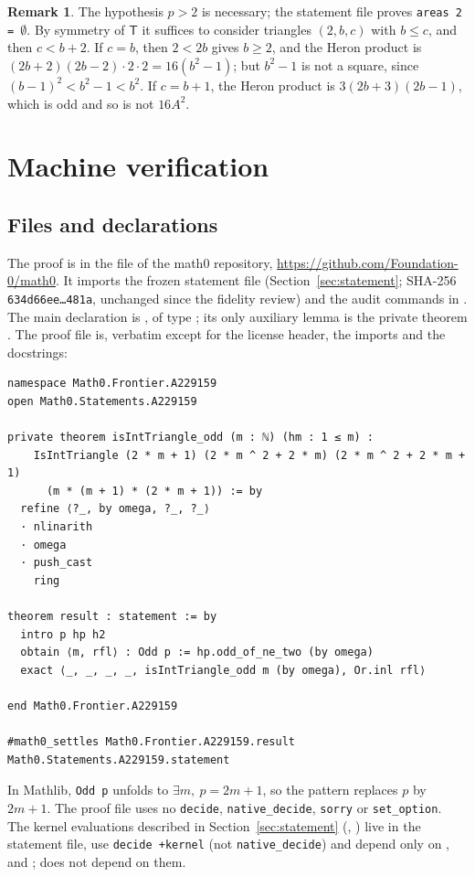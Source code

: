 \documentclass[11pt]{amsart}
\theoremstyle{plain}
\theoremstyle{definition}
\newtheorem{remark}[theorem]{Remark}
\newcommand{\T}{\mathsf{T}}
\begin{document}
\begin{remark}\label{rem:two}
The hypothesis $p>2$ is necessary; the statement file proves \texttt{areas 2 =~}$\emptyset$.
By symmetry of $\T$ it suffices to consider triangles $(2,b,c)$ with $b\le c$, and then $c<b+2$.
If $c=b$, then $2<2b$ gives $b\ge2$, and the Heron product is $(2b+2)(2b-2)\cdot2\cdot2=16(b^2-1)$; but $b^2-1$ is not a square, since $(b-1)^2<b^2-1<b^2$.
If $c=b+1$, the Heron product is $3(2b+3)(2b-1)$, which is odd and so is not $16A^2$.
\end{remark}

\section{Machine verification}\label{sec:lean}

\subsection*{Files and declarations}
The proof is in the file  of the math0 repository, \url{https://github.com/Foundation-0/math0}.
It imports the frozen statement file  (Section~\ref{sec:statement}; SHA-256 \texttt{634d66ee\ldots481a}, unchanged since the fidelity review) and the audit commands in .
The main declaration is , of type ; its only auxiliary lemma is the private theorem .
The proof file is, verbatim except for the license header, the imports and the docstrings:
\begin{lstlisting}
namespace Math0.Frontier.A229159
open Math0.Statements.A229159

private theorem isIntTriangle_odd (m : ℕ) (hm : 1 ≤ m) :
    IsIntTriangle (2 * m + 1) (2 * m ^ 2 + 2 * m) (2 * m ^ 2 + 2 * m + 1)
      (m * (m + 1) * (2 * m + 1)) := by
  refine ⟨?_, by omega, ?_, ?_⟩
  · nlinarith
  · omega
  · push_cast
    ring

theorem result : statement := by
  intro p hp h2
  obtain ⟨m, rfl⟩ : Odd p := hp.odd_of_ne_two (by omega)
  exact ⟨_, _, _, _, isIntTriangle_odd m (by omega), Or.inl rfl⟩

end Math0.Frontier.A229159

#math0_settles Math0.Frontier.A229159.result Math0.Statements.A229159.statement
\end{lstlisting}
In Mathlib, \texttt{Odd p} unfolds to $\exists m,\ p=2m+1$, so the pattern  replaces $p$ by $2m+1$.
The proof file uses no \texttt{decide}, \texttt{native\_decide}, \texttt{sorry} or \texttt{set\_option}.
The kernel evaluations described in Section~\ref{sec:statement} (, ) live in the statement file, use \texttt{decide +kernel} (not \texttt{native\_decide}) and depend only on ,  and ;  does not depend on them.
\end{document}

